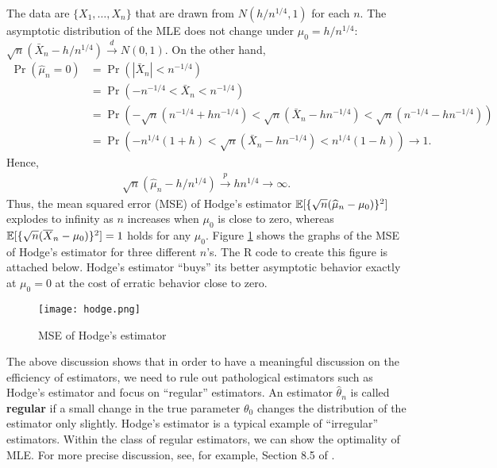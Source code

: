 \documentclass[11pt, A4paper, openany, uplatex]{book}
\begin{document}
The data are $\{X_1, \ldots, X_n\}$ that are drawn from $N(h/n^{1/4}, 1)$ for each $n$.
The asymptotic distribution of the MLE does not change under $\mu_0 = h/n^{1/4}$: $\sqrt{n}(\bar X_n - h/n^{1/4}) \overset{d}{\to} N(0,1)$.
On the other hand,
\begin{align*}
	\Pr(\hat \mu_n = 0)
	& = \Pr(|\bar X_n| < n^{-1/4}) \\
	& = \Pr(- n^{-1/4} < \bar X_n < n^{-1/4}) \\
	& = \Pr \left(- \sqrt{n}(n^{-1/4} + h n^{-1/4}) < \sqrt{n}(\bar X_n - h n^{-1/4}) < \sqrt{n}(n^{-1/4} - h n^{-1/4}) \right) \\
	& = \Pr\left(-n^{1/4}(1 + h) < \sqrt{n}(\bar X_n - h n^{-1/4}) < n^{1/4}(1 - h)\right) \to 1.
\end{align*}
Hence,
\begin{align*}
	\sqrt{n}(\hat \mu_n - h/n^{1/4}) \overset{p}{\to} hn^{1/4} \to \infty.
\end{align*}
Thus, the mean squared error (MSE) of Hodge's estimator $\mathbb{E} [\{\sqrt{n}(\widehat \mu_n - \mu_0)\}^2]$ explodes to infinity as $n$ increases when $\mu_0$ is close to zero, whereas $\mathbb{E}[\{\sqrt{n}(\overline X_n - \mu_0)\}^2] = 1$ holds for any $\mu_0$.
Figure \ref{fig:hodge} shows the graphs of the MSE of Hodge's estimator for three different $n$'s.
The R code to create this figure is attached below.
Hodge's estimator ``buys'' its better asymptotic behavior exactly at $\mu_0 = 0$ at the cost of erratic behavior close to zero.

\begin{figure}[h!]
	\begin{center}
		\texttt{[image: hodge.png]}
		\caption{MSE of Hodge's estimator}
		\label{fig:hodge}
	\end{center}
\end{figure}

The above discussion shows that in order to have a meaningful discussion on the efficiency of estimators, we need to rule out pathological estimators such as Hodge's estimator and focus on ``regular'' estimators.
An estimator $\hat \theta_n$ is called \textbf{regular} if a small change in the true parameter $\theta_0$ changes the distribution of the estimator only slightly.
Hodge's estimator is a typical example of ``irregular'' estimators.
Within the class of regular estimators, we can show the optimality of MLE.
For more precise discussion, see, for example, Section 8.5 of \cite{van2000asymptotic}.

\bigskip
\end{document}
